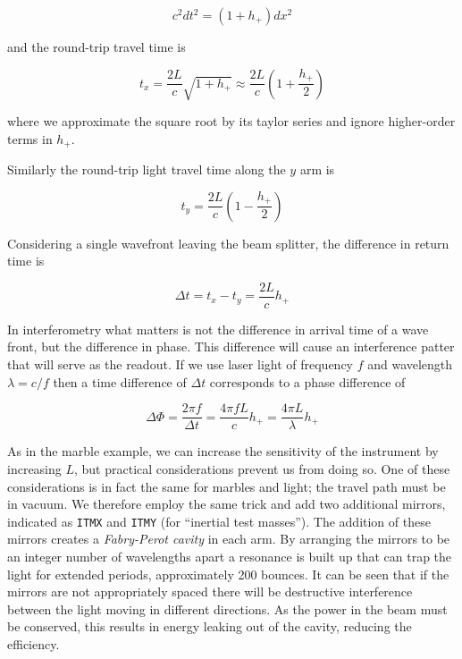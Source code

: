 \begin{equation*}
c^2 dt^2 = (1+h_+) dx^2
\end{equation*}

and the round-trip travel time is

\begin{equation*}
t_x = \frac{2L}{c} \sqrt{1+h_+} \approx \frac{2L}{c} \left(1+\frac{h_+}{2} \right)
\end{equation*}

where we approximate the square root by its taylor series and ignore
higher-order terms in $h_+$.

Similarly the round-trip light travel time along the $y$ arm is

\begin{equation*}
t_y = \frac{2L}{c} \left(1-\frac{h_+}{2} \right)
\end{equation*}


Considering a single wavefront leaving the beam splitter, the
difference in return time is

\begin{equation*}
\Delta t = t_x - t_y = \frac{2L}{c} h_+
\end{equation*}

In interferometry what matters is not the difference in arrival time
of a wave front, but the difference in phase.  This difference will
cause an interference patter that will serve as the readout.  If we
use laser light of frequency $f$ and wavelength $\lambda = c/f$ then a
time difference of $\Delta t$ corresponds to a phase difference of 

\begin{equation*}
\Delta \Phi = \frac{2\pi f}{\Delta t} = \frac{4\pi f L}{c} h_+
= \frac{4\pi L}{\lambda} h_+
\end{equation*}

As in the marble example, we can increase the sensitivity of the
instrument by increasing $L$, but practical considerations prevent us
from doing so.  One of these considerations is in fact the same for
marbles and light; the travel path must be in vacuum.  We
therefore employ the same trick and add two additional mirrors,
indicated as \texttt{ITMX} and \texttt{ITMY} (for ``inertial test
masses'').  The addition of these mirrors creates a \emph{Fabry-Perot
cavity} in each arm.  By arranging the mirrors to be an integer
number of wavelengths apart a resonance is built up that can trap the
light for extended periods, approximately 200 bounces.  It can be seen
that if the mirrors are not appropriately spaced there will be
destructive interference between the light moving in different
directions.  As the power in the beam must be conserved, this results
in energy leaking out of the cavity, reducing the efficiency.


